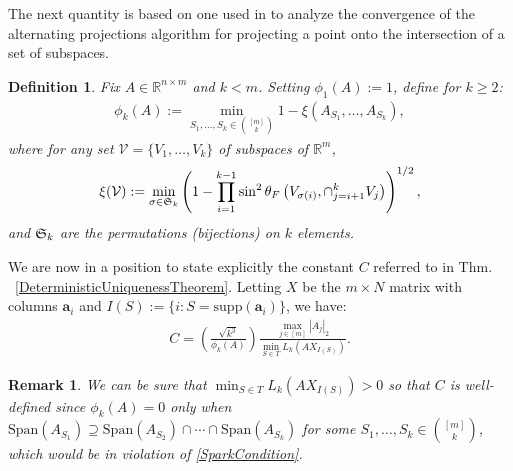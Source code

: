\documentclass[journal, twocolumn]{IEEEtran}
\newtheorem{definition}{Definition}
\newtheorem{remark}{Remark}
\begin{document}
The next quantity is based on one used in \cite{Deutsch12} to analyze the convergence of the alternating projections algorithm for projecting a point onto the intersection of a set of subspaces.

\begin{definition}\label{SpecialSupportSet}
Fix $A \in \mathbb{R}^{n \times m}$ and $k < m$. Setting $\phi_1(A) := 1$, define for $k \geq 2$:
\begin{align*}
\phi_k(A) := \min_{ S_1,\ldots,S_k \in {[m] \choose k} } 1 - \xi( A_{S_1}, \ldots, A_{S_k}),
\end{align*}
where for any set $\mathcal{V} = \{V_1, \ldots, V_k\}$ of subspaces of $\mathbb{R}^m$, 
\begin{align*}
\xi(\mathcal{V}) := \min_{\sigma \in \frak{S}_k} \left(1 - \prod_{i=1}^{k-1} \sin^2  \theta_F \left(V_{\sigma(i)}, \cap_{j=i+1}^k V_j \right)  \right)^{1/2},
\end{align*}
and $\frak{S}_{k}$ are the permutations (bijections) on $k$ elements. 
\end{definition}

We are now in a position to state explicitly the constant $C$ referred to in Thm. ~\ref{DeterministicUniquenessTheorem}. Letting 
$X$ be the $m \times N$ matrix with columns $\mathbf{a}_i$ and $I(S) := \{i : S = \text{supp}(\mathbf{a}_i)\}$, we have:
\begin{align}\label{Cdef}
C = \left( \frac{ \sqrt{k^3}}{ \phi_k(A) } \right) \frac{\max_{j \in [m]} |A_j|_2}{\min_{S \in T} L_k(AX_{I(S)})}.
\end{align}

\begin{remark}\label{nonzero}
We can be sure that $\min_{S \in T} L_k(AX_{I(S)}) > 0$ so that $C$ is well-defined since $\phi_k(A) = 0$ only when $\text{Span}(A_{S_1}) \supseteq \text{Span}(A_{S_2}) \cap \cdots \cap \text{Span}(A_{S_k})$ for some $S_1, \ldots, S_k \in {[m] \choose k}$, which would be in violation of \eqref{SparkCondition}.
\end{remark}
\end{document}
